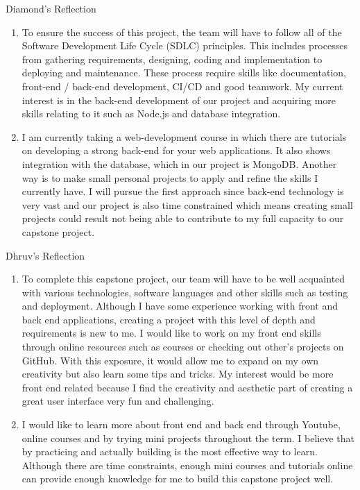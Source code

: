 \documentclass[12pt]{article}
\begin{document}
Diamond's Reflection
\begin{enumerate}
    \item To ensure the success of this project, the team will have to follow all of the Software Development Life Cycle (SDLC) principles. This includes processes from gathering requirements, designing, coding and implementation to deploying and maintenance. These process require skills like documentation, front-end / back-end development, CI/CD and good teamwork. My current interest is in the back-end development of our project and acquiring more skills relating to it such as Node.js and database integration. 

    \item I am currently taking a web-development course in which there are tutorials on developing a strong back-end for your web applications. It also shows integration with the database, which in our project is MongoDB. Another way is to make small personal projects to apply and refine the skills I currently have. I will pursue the first approach since back-end technology is very vast and our project is also time constrained which means creating small projects could result not being able to contribute to my full capacity to our capstone project.
\end{enumerate}


Dhruv's Reflection
\begin{enumerate}
    \item To complete this capstone project, our team will have to be well acquainted with various technologies, software languages and other skills such as testing and deployment. Although I have some experience working with front and back end applications, creating a project with this level of depth and requirements is new to me. I would like to work on my front end skills through online resources such as courses or checking out other's projects on GitHub. With this exposure, it would allow me to expand on my own creativity but also learn some tips and tricks. My interest would be more front end related because I find the creativity and aesthetic part of creating a great user interface very fun and challenging.  
    \item I would like to learn more about front end and back end through Youtube, online courses and by trying mini projects throughout the term. I believe that by practicing and actually building is the most effective way to learn. Although there are time constraints, enough mini courses and tutorials online can provide enough knowledge for me to build this capstone project well. 

\end{enumerate}
\end{document}

